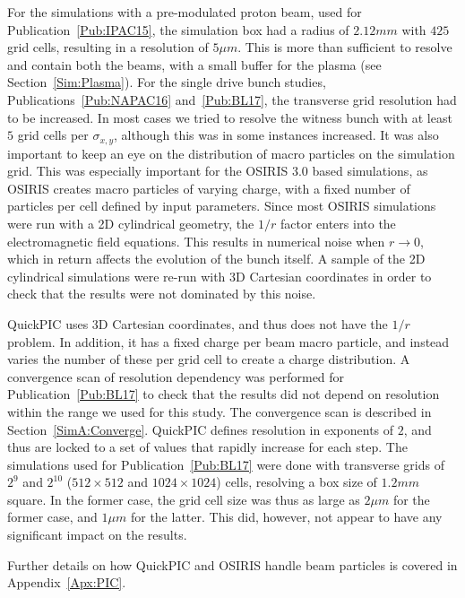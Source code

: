 For the simulations with a pre-modulated proton beam, used for Publication~\ref{Pub:IPAC15}, the simulation box had a radius of $2.12\unit{mm}$ with $425$ grid cells, resulting in a resolution of $5\unit{\mu m}$.
This is more than sufficient to resolve and contain both the beams, with a small buffer for the plasma (see Section~\ref{Sim:Plasma}).
For the single drive bunch studies, Publications~\ref{Pub:NAPAC16} and~\ref{Pub:BL17}, the transverse grid resolution had to be increased.
In most cases we tried to resolve the witness bunch with at least $5$ grid cells per $\sigma_{x,y}$, although this was in some instances increased.
It was also important to keep an eye on the distribution of macro particles on the simulation grid.
This was especially important for the OSIRIS 3.0 based simulations, as OSIRIS creates macro particles of varying charge, with a fixed number of particles per cell defined by input parameters.
Since most OSIRIS simulations were run with a 2D cylindrical geometry, the $1/r$ factor enters into the electromagnetic field equations.
This results in numerical noise when $r \to 0$, which in return affects the evolution of the bunch itself.
A sample of the 2D cylindrical simulations were re-run with 3D Cartesian coordinates in order to check that the results were not dominated by this noise.

QuickPIC uses 3D Cartesian coordinates, and thus does not have the $1/r$ problem.
In addition, it has a fixed charge per beam macro particle, and instead varies the number of these per grid cell to create a charge distribution.
A convergence scan of resolution dependency was performed for Publication~\ref{Pub:BL17} to check that the results did not depend on resolution within the range we used for this study. The convergence scan is described in Section~\ref{SimA:Converge}.
QuickPIC defines resolution in exponents of $2$, and thus are locked to a set of values that rapidly increase for each step.
The simulations used for Publication~\ref{Pub:BL17} were done with transverse grids of $2^{9}$ and $2^{10}$ ($512 \times 512$ and $1024 \times 1024$) cells, resolving a box size of $1.2\unit{mm}$ square.
In the former case, the grid cell size was thus as large as $2\unit{\mu m}$ for the former case, and $1\unit{\mu m}$ for the latter.
This did, however, not appear to have any significant impact on the results.

Further details on how QuickPIC and OSIRIS handle beam particles is covered in Appendix~\ref{Apx:PIC}.

